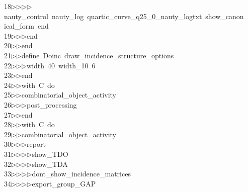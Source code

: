 \begin{tabbing}
18\>$\triangleright$\>$\triangleright$\>$\triangleright$\>$\triangleright$\>nauty\_control\ nauty\_log\ quartic\_curve\_q25\_0\_nauty\_logtxt\ show\_canon\\[0pt]
\>ical\_form\ end\ \\[0pt]
19\>$\triangleright$\>$\triangleright$\>$\triangleright$\>end\ \\[0pt]
20\>$\triangleright$\>$\triangleright$\>end\ \\[0pt]
21\>$\triangleright$\>$\triangleright$\>define\ Doinc\ draw\_incidence\_structure\_options\ \\[0pt]
22\>$\triangleright$\>$\triangleright$\>$\triangleright$\>width\ 40\ width\_10\ 6\ \\[0pt]
23\>$\triangleright$\>$\triangleright$\>end\ \\[0pt]
24\>$\triangleright$\>$\triangleright$\>with\ C\ do\ \\[0pt]
25\>$\triangleright$\>$\triangleright$\>combinatorial\_object\_activity\ \\[0pt]
26\>$\triangleright$\>$\triangleright$\>$\triangleright$\>post\_processing\ \\[0pt]
27\>$\triangleright$\>$\triangleright$\>end\ \\[0pt]
28\>$\triangleright$\>$\triangleright$\>with\ C\ do\ \\[0pt]
29\>$\triangleright$\>$\triangleright$\>combinatorial\_object\_activity\ \\[0pt]
30\>$\triangleright$\>$\triangleright$\>$\triangleright$\>report\ \\[0pt]
31\>$\triangleright$\>$\triangleright$\>$\triangleright$\>$\triangleright$\>show\_TDO\ \\[0pt]
32\>$\triangleright$\>$\triangleright$\>$\triangleright$\>$\triangleright$\>show\_TDA\ \\[0pt]
33\>$\triangleright$\>$\triangleright$\>$\triangleright$\>$\triangleright$\>dont\_show\_incidence\_matrices\ \\[0pt]
34\>$\triangleright$\>$\triangleright$\>$\triangleright$\>$\triangleright$\>export\_group\_GAP\ \\[0pt]

\end{tabbing}

